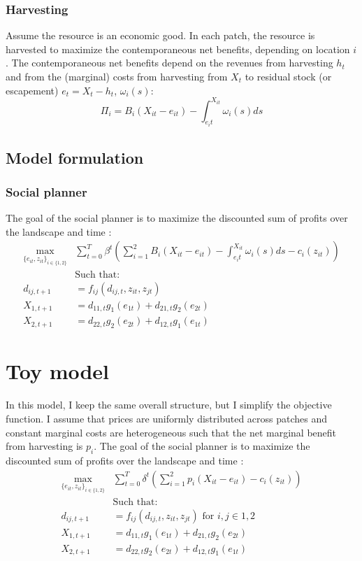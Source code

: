 \documentclass{article}
\begin{document}
\subsubsection{Harvesting}
Assume the resource is an economic good. 
In each patch, the resource is harvested to maximize the contemporaneous net benefits, depending on location $i$. The contemporaneous net benefits depend on the revenues from harvesting $h_t$ and from the (marginal) costs from harvesting from $X_t$ to residual stock (or escapement) $e_t = X_t - h_t$, $\omega_i(s)$: 
\begin{equation}
    \Pi_i = B_i(X_{it} - e_{it}) - \int_{e_it}^{X_{it}}\omega_i(s)ds
\end{equation}
\subsection{Model formulation}
\subsubsection{Social planner}
The goal of the social planner is to maximize the discounted sum of profits over the landscape and time : 
\begin{align*}
    \max_{\{e_{it}, z_{it}\}_{i\in \{1,2\}}} & \sum_{t=0}^T \beta^t \left( \sum_{i=1}^2 B_i(X_{it} - e_{it}) - \int_{e_it}^{X_{it}}\omega_i(s)ds - c_i(z_{it}) \right)\\
    &\text{Such that:}\\
        d_{ij,t+1} &= f_{ij}(d_{ij,t}, z_{it}, z_{jt})\\
         X_{1,t+1} &= d_{11,t} g_1(e_{1t}) + d_{21,t}g_2(e_{2t})\\
     X_{2,t+1} &= d_{22,t} g_2(e_{2t}) + d_{12,t}g_1(e_{1t})
\end{align*}
\section{Toy model}
In this model, I keep the same overall structure, but I simplify the objective function. I assume that prices are uniformly distributed across patches and constant marginal costs are heterogeneous such that the net marginal benefit from harvesting is $p_i$. The goal of the social planner is to maximize the discounted sum of profits over the landscape and time : 
\begin{align*}
    \max_{\{e_{it}, z_{it}\}_{i\in \{1,2\}}} & \sum_{t=0}^T \delta^t \left( \sum_{i=1}^2 p_i(X_{it} - e_{it}) - c_i(z_{it}) \right)\\
    &\text{Such that:}\\
        d_{ij,t+1} &= f_{ij}(d_{ij,t}, z_{it}, z_{jt}) \text{ for } i,j \in 1,2\\
         X_{1,t+1} &= d_{11,t} g_1(e_{1t}) + d_{21,t}g_2(e_{2t})\\
     X_{2,t+1} &= d_{22,t} g_2(e_{2t}) + d_{12,t}g_1(e_{1t})
\end{align*}
\end{document}

